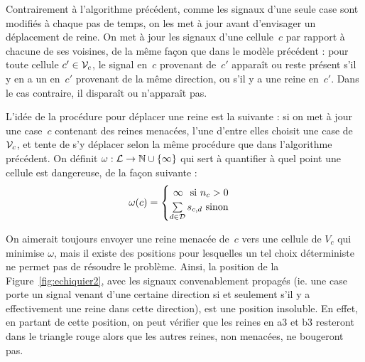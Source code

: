 
Contrairement à l'algorithme précédent, comme les signaux d'une seule case sont modifiés à chaque pas de temps, on les met à jour avant d'envisager un déplacement de reine. On met à jour les signaux d'une cellule~$c$ par rapport à chacune de ses voisines, de la même façon que dans le modèle précédent : pour toute cellule $c'\in\mathcal V_c$, le signal en~$c$ provenant de~$c'$ apparaît ou reste présent s'il y en a un en~$c'$ provenant de la même direction, ou s'il y a une reine en~$c'$. Dans le cas contraire, il disparaît ou n'apparaît pas.

L'idée de la procédure pour déplacer une reine est la suivante : si on met à jour une case~$c$ contenant des reines menacées, l'une d'entre elles choisit une case de $\mathcal V_c$, et tente de s'y déplacer selon la même procédure que dans l'algorithme précédent. 
On définit $\omega : \mathcal{L}\to\mathbb{N}\cup\{\infty\}$ qui sert à quantifier à quel point une cellule est dangereuse, de la façon suivante : \[
\omega(c) = 
\begin{cases}
  \hfill \infty \hfill \text{ si $n_c > 0$}\\
  \hfill \sum\limits_{d\in\D}s_{c,d} \hfill \text{ sinon}
\end{cases}
\]

On aimerait toujours envoyer une reine  menacée de~$c$ vers une cellule de $V_c$
qui minimise $\omega$, mais il existe des positions pour lesquelles un tel choix
déterministe ne  permet pas de résoudre  le problème.  Ainsi, la  position de la
Figure~\ref{fig:echiquier2}, avec  les signaux convenablement  propagés (ie. une
case porte un signal  venant d'une certaine direction si et seulement s'il y a
effectivement une reine  dans cette direction), est une  position insoluble.  En
effet, en partant de cette position, on peut vérifier que les reines en a3 et b3
resteront dans le  triangle rouge alors que les autres  reines, non menacées, ne
bougeront pas.




